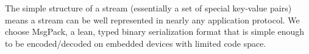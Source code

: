 The simple structure of a stream (essentially a set of special key-value pairs) means a stream can be well represented in nearly any application protocol.
We choose MsgPack, a lean, typed binary serialization format that is simple enough to be encoded/decoded on embedded devices with limited code space.




